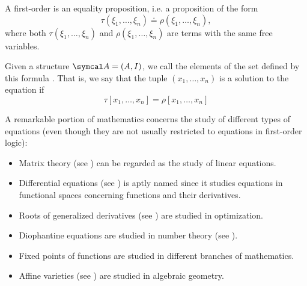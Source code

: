 \begin{definition}\label{def:first_order_equation}
  A first-order  is an equality proposition, i.e. a proposition of the form
  \begin{equation*}
    \tau(\xi_1, \ldots, \xi_n) \doteq \rho(\xi_1, \ldots, \xi_n),
  \end{equation*}
  where both \( \tau(\xi_1, \ldots, \xi_n) \) and \( \rho(\xi_1, \ldots, \xi_n) \) are terms with the same free variables.

  Given a structure \( \Cal{A} = (A, I) \), we call the elements of the set defined by this formula . That is, we say that the tuple \( (x_1, \ldots, x_n) \) is a solution to the equation if
  \begin{equation*}
    \tau[x_1, \ldots, x_n] = \rho[x_1, \ldots, x_n]
  \end{equation*}
\end{definition}

\begin{remark}\label{remark:equations}
  A remarkable portion of mathematics concerns the study of different types of equations (even though they are not usually restricted to equations in first-order logic):

  \begin{itemize}
    \item Matrix theory (see ) can be regarded as the study of linear equations.
    \item Differential equations (see ) is aptly named since it studies equations in functional spaces concerning functions and their derivatives.
    \item Roots of generalized derivatives (see ) are studied in optimization.
    \item Diophantine equations are studied in number theory (see ).
    \item Fixed points of functions are studied in different branches of mathematics.
    \item Affine varieties (see ) are studied in algebraic geometry.
  \end{itemize}
\end{remark}

